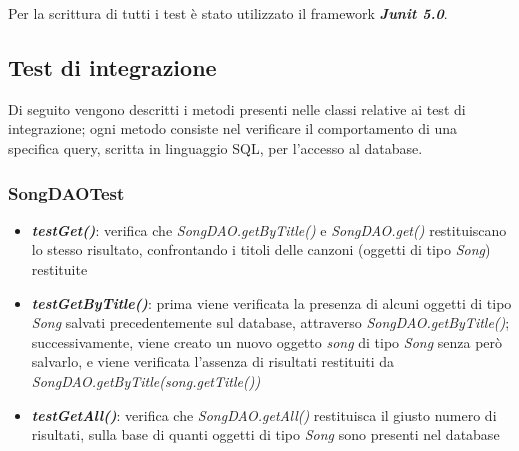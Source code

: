 \documentclass{article}
\begin{document}
  Per la scrittura di tutti i test è stato utilizzato il framework \textbf{\textit{Junit 5.0}}.

  \subsection{Test di integrazione}
  Di seguito vengono descritti i metodi presenti nelle classi relative ai test di integrazione; ogni metodo consiste nel verificare il comportamento di una specifica query, scritta in linguaggio SQL, per l'accesso al database.


  \subsubsection{SongDAOTest}
  \begin{itemize}

    \item \textbf{\textit{testGet()}}: verifica che \textit{SongDAO.getByTitle()} e \textit{SongDAO.get()} restituiscano lo stesso risultato, confrontando i titoli delle canzoni (oggetti di tipo \textit{Song}) restituite

    \item \textbf{\textit{testGetByTitle()}}: prima viene verificata la presenza di alcuni oggetti di tipo \textit{Song} salvati precedentemente sul database, attraverso \textit{SongDAO.getByTitle()}; successivamente, viene creato un nuovo oggetto \textit{song} di tipo \textit{Song} senza però salvarlo, e viene verificata l'assenza di risultati restituiti da \textit{SongDAO.getByTitle(song.getTitle())}

    \item \textbf{\textit{testGetAll()}}: verifica che \textit{SongDAO.getAll()} restituisca il giusto numero di risultati, sulla base di quanti oggetti di tipo \textit{Song} sono presenti nel database

  \end{itemize}
\end{document}
